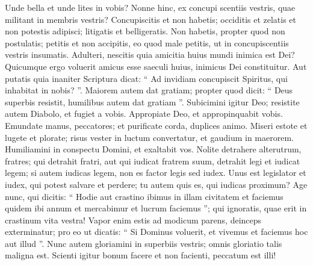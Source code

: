 \begin{biblechapter}
\begin{biblechapter}
\begin{biblechapter}
\begin{biblechapter}
\verse Unde bella et unde lites in vobis? Nonne hinc, ex concupi scentiis vestris, quae militant in membris vestris? 
\verse Concupiscitis et non habetis; occiditis et zelatis et non potestis adipisci; litigatis et belligeratis. Non habetis, propter quod non postulatis; 
\verse petitis et non accipitis, eo quod male petitis, ut in concupiscentiis vestris insumatis. 
\verse Adulteri, nescitis quia amicitia huius mundi inimica est Dei?
 Quicumque ergo voluerit amicus esse saeculi huius, inimicus Dei constituitur. 
 \verse Aut putatis quia inaniter Scriptura dicat: “ Ad invidiam concupiscit Spiritus, qui inhabitat in nobis? ”. 
\verse Maiorem autem dat gratiam; propter quod dicit:
 “ Deus superbis resistit,
 humilibus autem dat gratiam ”.
 \verse Subicimini igitur Deo; resistite autem Diabolo, et fugiet a vobis. 
\verse Appropiate Deo, et appropinquabit vobis. Emundate manus, peccatores; et purificate corda, duplices animo. 
\verse Miseri estote et lugete et plorate; risus vester in luctum convertatur, et gaudium in maerorem. 
\verse Humiliamini in conspectu Domini, et exaltabit vos.
 \verse Nolite detrahere alterutrum, fratres; qui detrahit fratri, aut qui iudicat fratrem suum, detrahit legi et iudicat legem; si autem iudicas legem, non es factor legis sed iudex. 
\verse Unus est legislator et iudex, qui potest salvare et perdere; tu autem quis es, qui iudicas proximum?
 \verse Age nunc, qui dicitis: “ Hodie aut crastino ibimus in illam civitatem et faciemus quidem ibi annum et mercabimur et lucrum faciemus ”; 
\verse qui ignoratis, quae erit in crastinum vita vestra! Vapor enim estis ad modicum parens, deinceps exterminatur; 
\verse pro eo ut dicatis: “ Si Dominus voluerit, et vivemus et faciemus hoc aut illud ”. 
\verse Nunc autem gloriamini in superbiis vestris; omnis gloriatio talis maligna est. 
\verse Scienti igitur bonum facere et non facienti, peccatum est illi!
 

\end{biblechapter}
\end{biblechapter}
\end{biblechapter}
\end{biblechapter}
